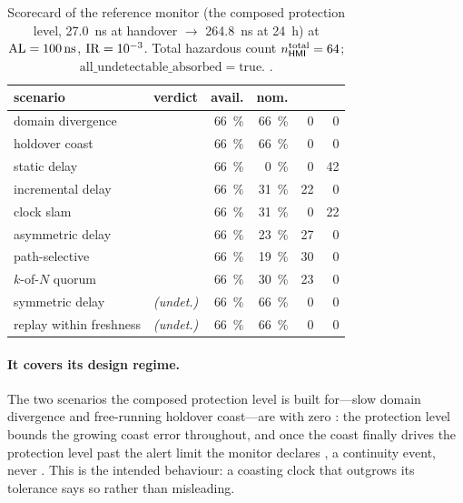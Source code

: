 \begin{table}[t]
  \centering
  \caption{Scorecard of the reference monitor (the composed protection level,
  \SI{27.0}{\nano\second} at handover $\to$ \SI{264.8}{\nano\second} at
  \SI{24}{\hour}) at $\mathrm{AL}=\SI{100}{\nano\second}$, $\mathrm{IR}=\num{e-3}$. Total
  hazardous count $n_{\textsf{HMI}{}}^{\text{total}}=64$;
  $\mathrm{all\_undetectable\_absorbed}=\text{true}$. \Modelled{}.}
  \label{tab:refcard}
  \begin{tabular}{l l r r r r}
    \toprule
    scenario & verdict & avail. & nom. & \MI{} & \HMI{} \\
    \midrule
    domain divergence        & \CovPass{}                    & \SI{66}{\percent} & \SI{66}{\percent} & 0  & 0  \\
    holdover coast           & \CovPass{}                    & \SI{66}{\percent} & \SI{66}{\percent} & 0  & 0  \\
    static delay             & \CovFail{}                    & \SI{66}{\percent} & \SI{0}{\percent}  & 0  & 42 \\
    incremental delay        & \CovPass{}                    & \SI{66}{\percent} & \SI{31}{\percent} & 22 & 0  \\
    clock slam               & \CovFail{}                    & \SI{66}{\percent} & \SI{31}{\percent} & 0  & 22 \\
    asymmetric delay         & \CovPass{}                    & \SI{66}{\percent} & \SI{23}{\percent} & 27 & 0  \\
    path-selective           & \CovPass{}                    & \SI{66}{\percent} & \SI{19}{\percent} & 30 & 0  \\
    $k$-of-$N$ quorum        & \CovPass{}                    & \SI{66}{\percent} & \SI{30}{\percent} & 23 & 0  \\
    symmetric delay          & \Absorbed{}   \emph{(undet.)} & \SI{66}{\percent} & \SI{66}{\percent} & 0  & 0  \\
    replay within freshness  & \Absorbed{}   \emph{(undet.)} & \SI{66}{\percent} & \SI{66}{\percent} & 0  & 0  \\
    \bottomrule
  \end{tabular}
\end{table}

\paragraph{It covers its design regime.} The two scenarios the composed protection
level is built for---slow domain divergence and free-running holdover coast---are
\CovPass{} with zero \HMI{}: the protection level bounds the growing coast error
throughout, and once the coast finally drives the protection level past the alert
limit the monitor declares \Unavail{}, a continuity event, never \HMI{}. This is
the intended behaviour: a coasting clock that outgrows its tolerance says so rather
than misleading.

